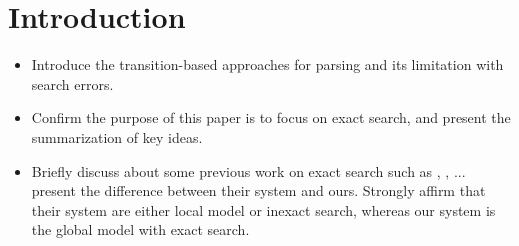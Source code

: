 \section {Introduction}
\begin{itemize}
	\item Introduce the transition-based approaches for parsing and its limitation with search errors.
	\item Confirm the purpose of this paper is to focus on exact search, and present the summarization of key ideas.
	\item Briefly discuss about some previous work on exact search such as \cite{2013Zhao}, \cite{2010Huang}, \cite{2006Sagae}... present the difference between their system and ours. Strongly affirm that their system are either local model or inexact search, whereas our system is the global model with exact search.
\end{itemize}